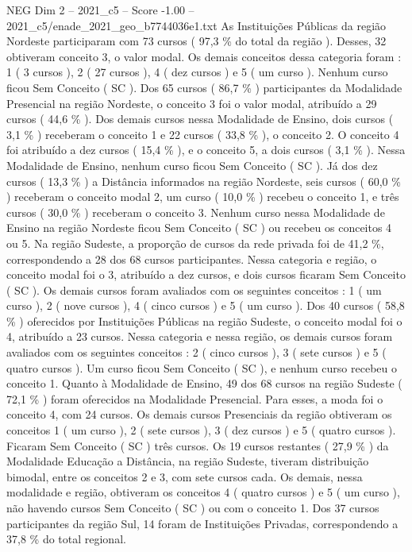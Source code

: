 \begin{textsample}{NEG Dim 2 – 2021\_c5 – Score -1.00 – 2021\_c5/enade\_2021\_geo\_b7744036e1.txt}
As Instituições Públicas da região Nordeste participaram com 73 cursos ( 97,3 \% do total da região ).
Desses, 32 obtiveram conceito 3, o valor modal.
Os demais conceitos dessa categoria foram : 1 ( 3 cursos ), 2 ( 27 cursos ), 4 ( dez cursos ) e 5 ( um curso ).
Nenhum curso ficou Sem Conceito ( SC ).
Dos 65 cursos ( 86,7 \% ) participantes da Modalidade Presencial na região Nordeste, o conceito 3 foi o valor modal, atribuído a 29 cursos ( 44,6 \% ).
Dos demais cursos nessa Modalidade de Ensino, dois cursos ( 3,1 \% ) receberam o conceito 1 e 22 cursos ( 33,8 \% ), o conceito 2.
O conceito 4 foi atribuído a dez cursos ( 15,4 \% ), e o conceito 5, a dois cursos ( 3,1 \% ).
Nessa Modalidade de Ensino, nenhum curso ficou Sem Conceito ( SC ).
Já dos dez cursos ( 13,3 \% ) a Distância informados na região Nordeste, seis cursos ( 60,0 \% ) receberam o conceito modal 2, um curso ( 10,0 \% ) recebeu o conceito 1, e três cursos ( 30,0 \% ) receberam o conceito 3.
Nenhum curso nessa Modalidade de Ensino na região Nordeste ficou Sem Conceito ( SC ) ou recebeu os conceitos 4 ou 5.
Na região Sudeste, a proporção de cursos da rede privada foi de 41,2 \%, correspondendo a 28 dos 68 cursos participantes.
Nessa categoria e região, o conceito modal foi o 3, atribuído a dez cursos, e dois cursos ficaram Sem Conceito ( SC ).
Os demais cursos foram avaliados com os seguintes conceitos : 1 ( um curso ), 2 ( nove cursos ), 4 ( cinco cursos ) e 5 ( um curso ).
Dos 40 cursos ( 58,8 \% ) oferecidos por Instituições Públicas na região Sudeste, o conceito modal foi o 4, atribuído a 23 cursos.
Nessa categoria e nessa região, os demais cursos foram avaliados com os seguintes conceitos : 2 ( cinco cursos ), 3 ( sete cursos ) e 5 ( quatro cursos ).
Um curso ficou Sem Conceito ( SC ), e nenhum curso recebeu o conceito 1.
Quanto à Modalidade de Ensino, 49 dos 68 cursos na região Sudeste ( 72,1 \% ) foram oferecidos na Modalidade Presencial.
Para esses, a moda foi o conceito 4, com 24 cursos.
Os demais cursos Presenciais da região obtiveram os conceitos 1 ( um curso ), 2 ( sete cursos ), 3 ( dez cursos ) e 5 ( quatro cursos ).
Ficaram Sem Conceito ( SC ) três cursos.
Os 19 cursos restantes ( 27,9 \% ) da Modalidade Educação a Distância, na região Sudeste, tiveram distribuição bimodal, entre os conceitos 2 e 3, com sete cursos cada.
Os demais, nessa modalidade e região, obtiveram os conceitos 4 ( quatro cursos ) e 5 ( um curso ), não havendo cursos Sem Conceito ( SC ) ou com o conceito 1.
Dos 37 cursos participantes da região Sul, 14 foram de Instituições Privadas, correspondendo a 37,8 \% do total regional.

\end{textsample}
